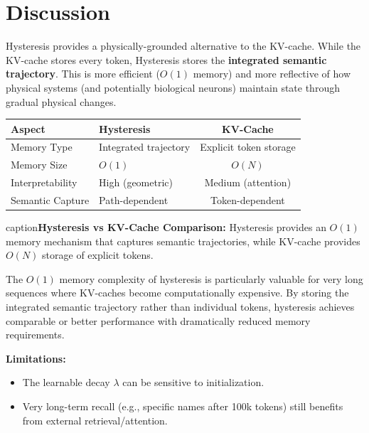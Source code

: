 \documentclass[12pt,a4paper]{article}
\begin{document}
\section{Discussion}

Hysteresis provides a physically-grounded alternative to the KV-cache. While the KV-cache stores every token, Hysteresis stores the \textbf{integrated semantic trajectory}. This is more efficient ($O(1)$ memory) and more reflective of how physical systems (and potentially biological neurons) maintain state through gradual physical changes.

\begin{table}[htbp]
\centering
\begin{tabular}{@{}lp{5cm}c@{}}
\toprule
\textbf{Aspect} & \textbf{Hysteresis} & \textbf{KV-Cache} \\
\midrule
Memory Type & Integrated trajectory & Explicit token storage \\
Memory Size & $O(1)$ & $O(N)$ \\
Interpretability & High (geometric) & Medium (attention) \\
Semantic Capture & Path-dependent & Token-dependent \\
\bottomrule
\end{tabular}
caption{\textbf{Hysteresis vs KV-Cache Comparison:} Hysteresis provides 
         an $O(1)$ memory mechanism that captures semantic trajectories, 
         while KV-cache provides $O(N)$ storage of explicit tokens.}
\label{tab:comparison}
\end{table}

The $O(1)$ memory complexity of hysteresis is particularly valuable for very long sequences where KV-caches become computationally expensive. By storing the integrated semantic trajectory rather than individual tokens, hysteresis achieves comparable or better performance with dramatically reduced memory requirements.

\textbf{Limitations:}
\begin{itemize}[leftmargin=1.5cm]
\item The learnable decay $\lambda$ can be sensitive to initialization.
\item Very long-term recall (e.g., specific names after 100k tokens) still benefits from external retrieval/attention.
\end{itemize}
\end{document}

